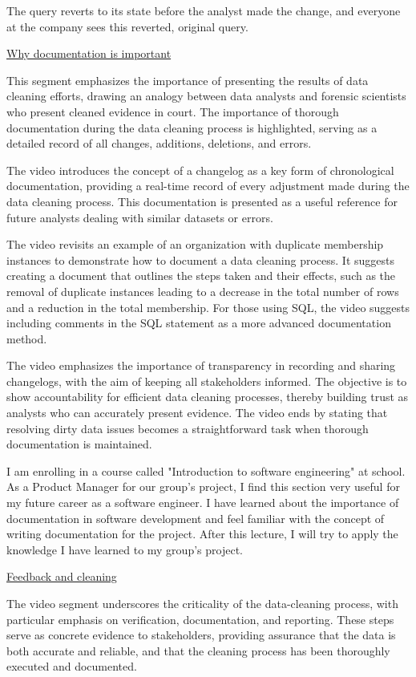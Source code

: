 \documentclass[]{article}
\begin{document}
The query reverts to its state before the analyst made the change, and everyone at the company sees this reverted, original query.

\uline{Why documentation is important}

This segment emphasizes the importance of presenting the results of data cleaning efforts, drawing an analogy between data analysts and forensic scientists who present cleaned evidence in court. The importance of thorough documentation during the data cleaning process is highlighted, serving as a detailed record of all changes, additions, deletions, and errors.

The video introduces the concept of a changelog as a key form of chronological documentation, providing a real-time record of every adjustment made during the data cleaning process. This documentation is presented as a useful reference for future analysts dealing with similar datasets or errors.

The video revisits an example of an organization with duplicate membership instances to demonstrate how to document a data cleaning process. It suggests creating a document that outlines the steps taken and their effects, such as the removal of duplicate instances leading to a decrease in the total number of rows and a reduction in the total membership. For those using SQL, the video suggests including comments in the SQL statement as a more advanced documentation method.

The video emphasizes the importance of transparency in recording and sharing changelogs, with the aim of keeping all stakeholders informed. The objective is to show accountability for efficient data cleaning processes, thereby building trust as analysts who can accurately present evidence. The video ends by stating that resolving dirty data issues becomes a straightforward task when thorough documentation is maintained.

I am enrolling in a course called "Introduction to software engineering" at school. As a Product Manager for our group's project,  I find this section very useful for my future career as a software engineer. I have learned about the importance of documentation in software development and feel familiar with the concept of writing documentation for the project. After this lecture, I will try to apply the knowledge I have learned to my group's project.

\uline{Feedback and cleaning}

The video segment underscores the criticality of the data-cleaning process, with particular emphasis on verification, documentation, and reporting. These steps serve as concrete evidence to stakeholders, providing assurance that the data is both accurate and reliable, and that the cleaning process has been thoroughly executed and documented.
\end{document}
